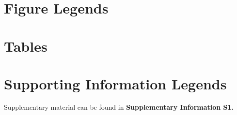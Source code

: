 \documentclass[11pt]{article}
\begin{document}


\section*{Figure Legends}


\clearpage

\section*{Tables}

\section*{Supporting Information Legends}

Supplementary material can be found in {\bf Supplementary Information S1.}
\end{document}
